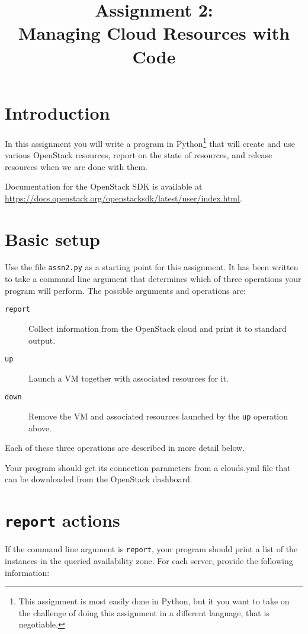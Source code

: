 \documentclass{article}
\begin{document}
\title{Assignment 2:  \\Managing Cloud Resources with Code}
\date{}

\maketitle

\section*{Introduction}

In this assignment you will write a program in Python\footnote{This assignment is most easily done in Python, but it you want to take on the challenge of doing this assignment in a different language, that is negotiable.} that will create and use various OpenStack resources, report on the state of resources, and release resources when we are done with them.

Documentation for the OpenStack SDK is available at \url{https://docs.openstack.org/openstacksdk/latest/user/index.html}.

\section{Basic setup}
Use the file \texttt{assn2.py} as a starting point for this assignment. It has been written to take a command line argument that determines which of three operations your program will perform. The possible arguments and operations are:

\begin{description}
\item[\texttt{report}] Collect information from the OpenStack cloud and print it to standard output.
\item[\texttt{up}] Launch a VM together with associated resources for it.
\item[\texttt{down}] Remove the VM and associated resources launched by the \texttt{up} operation above.
\end{description}

Each of these three operations are described in more detail below.

Your program should get its connection parameters from a clouds.yml file that can be downloaded from the OpenStack dashboard.

\section{\texttt{report} actions}
If the command line argument is \texttt{report}, your program should print a list of the instances in the queried availability zone.  For each server, provide the following information:
\end{document}
